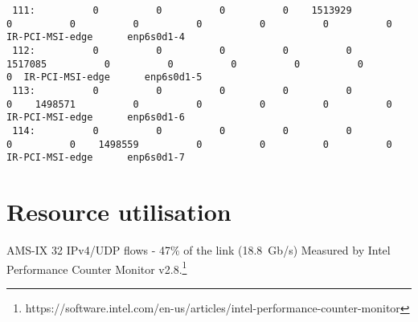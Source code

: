 \begin{lstlisting}
 111:          0          0          0          0    1513929          0          0          0          0          0          0          0  IR-PCI-MSI-edge      enp6s0d1-4
 112:          0          0          0          0          0    1517085          0          0          0          0          0          0  IR-PCI-MSI-edge      enp6s0d1-5
 113:          0          0          0          0          0          0    1498571          0          0          0          0          0  IR-PCI-MSI-edge      enp6s0d1-6
 114:          0          0          0          0          0          0          0    1498559          0          0          0          0  IR-PCI-MSI-edge      enp6s0d1-7
\end{lstlisting}
















\section{Resource utilisation}
AMS-IX 32 IPv4/UDP flows - 47\% of the link (18.8~Gb/s)
Measured by Intel Performance Counter Monitor v2.8.\footnote{https://software.intel.com/en-us/articles/intel-performance-counter-monitor}


